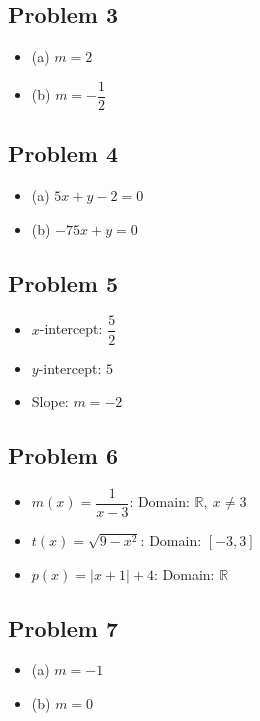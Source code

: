 \documentclass[12pt]{article}
\begin{document}
\subsection*{Problem 3}
\begin{itemize}
    \item (a) \( m = 2 \)
    \item (b) \( m = -\dfrac{1}{2} \)
\end{itemize}

\subsection*{Problem 4}
\begin{itemize}
    \item (a) \( 5x + y - 2 = 0 \)
    \item (b) \( -75x + y = 0 \)
\end{itemize}

\subsection*{Problem 5}
\begin{itemize}
    \item \(x\)-intercept: \( \dfrac{5}{2} \)
    \item \(y\)-intercept: \( 5 \)
    \item Slope: \( m = -2 \)
\end{itemize}

\subsection*{Problem 6}
\begin{itemize}
    \item \( m(x) = \dfrac{1}{x-3} \): Domain: \( \mathbb{R},\ x \neq 3 \)
    \item \( t(x) = \sqrt{9 - x^2} \): Domain: \( [-3, 3] \)
    \item \( p(x) = |x+1| + 4 \): Domain: \( \mathbb{R} \)
\end{itemize}

\subsection*{Problem 7}
\begin{itemize}
    \item (a) \( m = -1 \)
    \item (b) \( m = 0 \)
\end{itemize}
\end{document}
